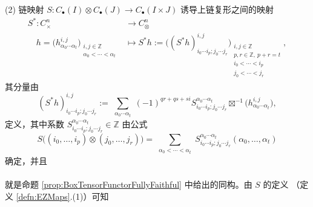 \begin{dfn}
(2) 链映射
$
S:
C_{\bullet}(I)\otimes C_{\bullet}(J)
\rightarrow
C_{\bullet}(I\times J)
$
诱导上链复形之间的映射
\begin{align*}
S^*:
C_{\times}^n
&\rightarrow
C_{\otimes}^n
\\
\quad
h
=
\Big(
h_{\alpha_0\cdots\alpha_t}^{i,j}
\Big)
_{\substack{
i,j\in\mathbb{Z}
\\
\alpha_0<\cdots<\alpha_t
}}
&\mapsto
S^*h
:=
\Big(
(S^*h)_{i_0\cdots i_p;j_0\cdots j_r}^{i,j}
\Big)
_{\substack{
i,j\in\mathbb{Z}\phantom{,\ p+r=t}
\\
p,r\in\mathbb{Z},\ p+r=t
\\
i_0<\cdots<i_p\quad\
\\
j_0<\cdots<j_r\quad\
}},
\end{align*}
其分量由
$$
(S^*h)_{i_0\cdots i_p;j_0\cdots j_r}^{i,j}
:=
\sum_{\substack{
\alpha_0\cdots\alpha_t
}}
(-1)^{qr+qs+si}
S_{i_0\cdots i_p;j_0\cdots j_r}^{\alpha_0\cdots\alpha_t}
\boxtimes^{-1}\big(h_{\alpha_0\cdots\alpha_t}^{i,j}\big),
$$
定义，其中系数
$
S_{i_0\cdots i_p;j_0\cdots j_r}^{\alpha_0\cdots\alpha_t}
\in\mathbb{Z}
$
由公式
$$
S\big((i_0,\dots,i_p)\otimes(j_0,\dots,j_r)\big)
=
\sum_{\substack{
\alpha_0<\cdots<\alpha_t
}}
S_{i_0\cdots i_p;j_0\cdots j_r}^{\alpha_0\cdots\alpha_t}
(\alpha_0,\dots,\alpha_t)
$$
确定，并且\newline
{}\\
\\
就是命题 \ref{prop:BoxTensorFunctorFullyFaithful} 中给出的同构。由 $S$ 的定义
（定义 \ref{defn:EZMaps}.(1)）可知
\begin{center}
\end{center}


\end{dfn}
